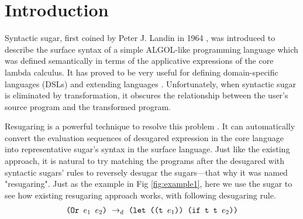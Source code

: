\section{Introduction}








Syntactic sugar, first coined by Peter J. Landin in 1964 \cite{syntacticsugar}, was introduced to describe the surface syntax of a simple ALGOL-like programming language which was defined semantically in terms of the applicative expressions of the core lambda calculus. It has proved to be very useful for defining domain-specific languages (DSLs) and extending languages \cite{FellFFKBMT18,CulpFFK19}.
Unfortunately, when syntactic sugar is eliminated by transformation, it obscures the relationship between the user’s source program and the transformed program.



Resugaring is a powerful technique to resolve this problem \cite{resugaring,hygienic}. It  can automatically convert the evaluation sequences of desugared expression in the core language into representative sugar's syntax in the surface language. Just like the existing approach, it is natural to try matching the programs after the desugared with syntactic sugars' rules to reversely desugar the sugars---that why it was named "resugaring". Just as the example in Fig \ref{fig:example1}, here we use the sugar  to see how existing resugaring approach works, with following desugaring rule.
\[
\begin{array}{l}
\texttt{(Or $e_1$ $e_2$)} ~\rightarrow_d~ \texttt{(let ((t $e_1$)) (if t t $e_2$))}\\
\end{array}
\]

